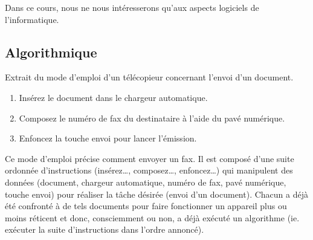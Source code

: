 Dans ce cours, nous ne nous intéresserons qu'aux aspects logiciels de l'informatique.


\subsection{Algorithmique}
\begin{ex}\label{ex:modemploi}
Extrait du mode d'emploi d'un télécopieur concernant l'envoi d'un document.
\begin{enumerate}
\item Insérez le document dans le chargeur automatique.
\item Composez le numéro de fax du destinataire à l'aide du pavé numérique.
\item Enfoncez la touche {\sc envoi} pour lancer l'émission.
\end{enumerate}
\end{ex}
Ce mode d'emploi précise comment envoyer un fax. Il est composé d'une suite 
ordonnée d'instructions (insérez\ldots, composez\ldots, enfoncez\ldots) qui
manipulent des données (document, chargeur automatique, numéro de fax, pavé numérique,
touche {\sc envoi}) pour réaliser la tâche désirée (envoi d'un document).
Chacun a déjà été confronté à de tels documents pour faire fonctionner un 
appareil plus ou moins réticent et donc, consciemment ou non, a déjà 
exécuté un algorithme (ie. exécuter la suite d'instructions dans l'ordre annoncé).

